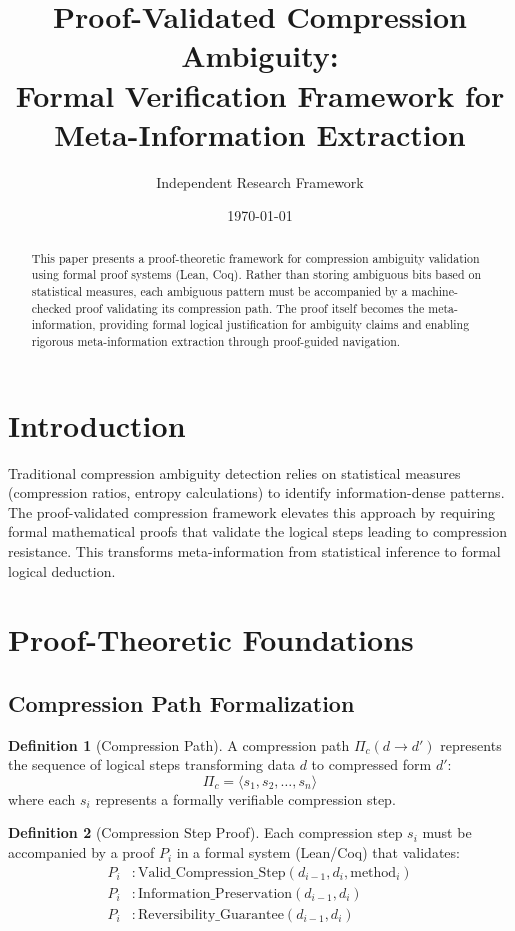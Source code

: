 \documentclass[12pt,a4paper]{article}
\title{\textbf{Proof-Validated Compression Ambiguity:\\
Formal Verification Framework for Meta-Information Extraction}}
\author{Independent Research Framework}
\date{\today}
\theoremstyle{definition}
\newtheorem{definition}{Definition}
\begin{document}
\maketitle

\begin{abstract}
This paper presents a proof-theoretic framework for compression ambiguity validation using formal proof systems (Lean, Coq). Rather than storing ambiguous bits based on statistical measures, each ambiguous pattern must be accompanied by a machine-checked proof validating its compression path. The proof itself becomes the meta-information, providing formal logical justification for ambiguity claims and enabling rigorous meta-information extraction through proof-guided navigation.
\end{abstract}

\section{Introduction}

Traditional compression ambiguity detection relies on statistical measures (compression ratios, entropy calculations) to identify information-dense patterns. The proof-validated compression framework elevates this approach by requiring formal mathematical proofs that validate the logical steps leading to compression resistance. This transforms meta-information from statistical inference to formal logical deduction.

\section{Proof-Theoretic Foundations}

\subsection{Compression Path Formalization}

\begin{definition}[Compression Path]
A compression path $\Pi_c(d \rightarrow d')$ represents the sequence of logical steps transforming data $d$ to compressed form $d'$:
\begin{equation}
\Pi_c = \langle s_1, s_2, \ldots, s_n \rangle
\end{equation}
where each $s_i$ represents a formally verifiable compression step.
\end{definition}

\begin{definition}[Compression Step Proof]
Each compression step $s_i$ must be accompanied by a proof $P_i$ in a formal system (Lean/Coq) that validates:
\begin{align}
P_i &: \text{Valid\_Compression\_Step}(d_{i-1}, d_i, \text{method}_i) \\
P_i &: \text{Information\_Preservation}(d_{i-1}, d_i) \\
P_i &: \text{Reversibility\_Guarantee}(d_{i-1}, d_i)
\end{align}
\end{definition}
\end{document}
